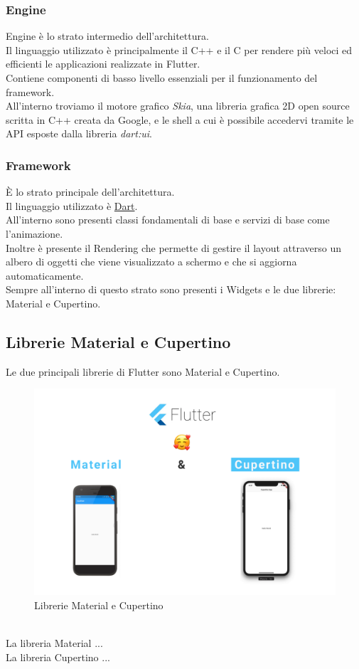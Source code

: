 \subsubsection{Engine}
Engine è lo strato intermedio dell'architettura.\\
Il linguaggio utilizzato è principalmente il C++ e il C per rendere più veloci ed efficienti le applicazioni realizzate in Flutter.\\
Contiene componenti di basso livello essenziali per il funzionamento del framework.\\
All'interno troviamo il motore grafico \textit{Skia}, una libreria grafica 2D open source scritta in C++ creata da Google, e le shell a cui è possibile accedervi tramite le API esposte dalla libreria \textit{dart:ui}.

\subsubsection{Framework}
È lo strato principale dell'architettura.\\
Il linguaggio utilizzato è \hyperref[sec:Dart]{Dart}.\\
All'interno sono presenti classi fondamentali di base e servizi di base come l'animazione.\\
Inoltre è presente il Rendering che permette di gestire il layout attraverso un albero di oggetti che viene visualizzato
a schermo e che si aggiorna automaticamente.\\
Sempre all'interno di questo strato sono presenti i Widgets e le due librerie: Material e Cupertino.

\newpage

\subsection{Librerie Material e Cupertino}
Le due principali librerie di Flutter sono Material e Cupertino.\\
\begin{figure}[htbp]	
	\centering
	\includegraphics[width=14cm]{immagini/librerieCM.png}
	\caption{Librerie Material e Cupertino}
	\label{fig:Librerie Material e Cupertino}
\end{figure}
\\
La libreria Material ...\\
La libreria Cupertino ...

